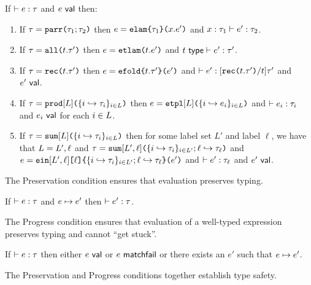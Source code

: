 {{{{\begin{condition}\label{condition:canonical-forms-UP} If $\vdash e : \tau$ and $e~\mathsf{val}$ then:
\begin{enumerate}
\item If $\tau=\texttt{parr}\texttt{(}\tau_1; \tau_2\texttt{)}$ then $e=\texttt{elam}\texttt{\{}\tau_1\texttt{\}(}x.e'\texttt{)}$ and $x : \tau_1 \vdash e' : \tau_2$.
\item If $\tau=\texttt{all}\texttt{(}t.\tau'\texttt{)}$ then $e=\texttt{etlam}\texttt{(}t.e'\texttt{)}$ and $t~\mathsf{type} \vdash e' : \tau'$.
\item If $\tau=\texttt{rec}\texttt{(}t.\tau'\texttt{)}$ then $e=\texttt{efold}\texttt{\{}t.\tau'\texttt{\}(}e'\texttt{)}$ and $\vdash e' : [\texttt{rec}\texttt{(}t.\tau'\texttt{)}/t]\tau'$ and $e'~\mathsf{val}$. 
\item If $\tau=\texttt{prod}[L]\texttt{(}\{i \hookrightarrow \tau_{i}\}_{i \in L}\texttt{)}$ then $e=\texttt{etpl}[L]\texttt{(}\{i \hookrightarrow e_{i}\}_{i \in L}\texttt{)}$ and $\vdash e_i : \tau_i$ and $e_i~\mathsf{val}$ for each $i \in L$.
\item If $\tau=\texttt{sum}[L]\texttt{(}\{i \hookrightarrow \tau_{i}\}_{i \in L}\texttt{)}$ then for some label set $L'$ and label $\ell$, we have that $L=L', \ell$ and $\tau=\texttt{sum}[L', \ell]\texttt{(}\{i \hookrightarrow \tau_{i}\}_{i \in L'}; \ell \hookrightarrow \tau_\ell\texttt{)}$ and $e=\texttt{ein}[L', \ell]\texttt{[}\ell\texttt{]\{}\{i \hookrightarrow \tau_{i}\}_{i \in L'}; \ell \hookrightarrow \tau_\ell\texttt{\}(}e'\texttt{)}$ and $\vdash e' : \tau_\ell$ and $e'~\mathsf{val}$.\end{enumerate}\end{condition}

The Preservation condition ensures that evaluation preserves typing.
\begin{condition}[Preservation]\label{condition:preservation-UP} If $\vdash e : \tau$ and $e \mapsto e'$ then $\vdash e' : \tau$. \end{condition}
The Progress condition ensures that evaluation of a well-typed expression preserves typing and cannot ``get stuck''.
\begin{condition}[Progress]\label{condition:progress-UP} If $\vdash e : \tau$ then either $e~\mathsf{val}$ or $e~\mathsf{matchfail}$ or there exists an $e'$ such that $e \mapsto e'$. \end{condition}
 
The Preservation and Progress conditions together establish type safety.

}}}}
